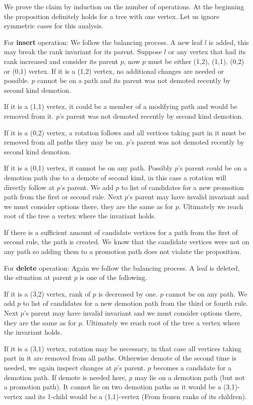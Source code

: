 \begin{myproof}
We prove the claim by induction on the number of operations. At the beginning the proposition definitely holds for a tree with one vertex. 
Let us ignore symmetric cases for this analysis.

For \textbf{insert} operation: We follow the balancing process. A new leaf $l$ is added, this may break the rank invariant for its parent. Suppose $l$ or any vertex that had its rank increased and consider its parent $p$, now $p$ must be either (1,2), (1,1), (0,2) or (0,1) vertex. 
If it is a (1,2) vertex, no additional changes are needed or possible. $p$ cannot be on a path and its parent was not demoted recently by second kind demotion.

If it is a (1,1) vertex, it could be a member of a modifying path and would be removed from it. $p$'s parent was not demoted recently by second kind demotion.

If it is a (0,2) vertex, a rotation follows and all vertices taking part in it must be removed from all paths they may be on. $p$'s parent was not demoted recently by second kind demotion.

If it is a (0,1) vertex, it cannot be on any path. Possibly $p$'s parent could be on a demotion path due to a demote of second kind, in this case a rotation will directly follow at $p$'s parent. We add $p$ to list of candidates for a new promotion path from the first or second rule. Next $p$'s parent may have invalid invariant and we must consider options there, they are the same as for $p$. Ultimately we reach root of the tree a vertex where the invariant holds.

If there is a sufficient amount of candidate vertices for a path from the first of second rule, the path is created. We know that the candidate vertices were not on any path so adding them to a promotion path does not violate the proposition.

For \textbf{delete} operation: Again we follow the balancing process. A leaf is deleted, the situation at parent $p$ is one of the following.

If it is a (3,2) vertex, rank of $p$ is decreased by one. $p$ cannot be on any path. We add $p$ to list of candidates for a new demotion path from the third or fourth rule. Next $p$'s parent may have invalid invariant and we must consider options there, they are the same as for $p$. Ultimately we reach root of the tree a vertex where the invariant holds.

If it is a (3,1) vertex, rotation may be necessary, in that case all vertices taking part in it are removed from all paths. Otherwise demote of the second time is needed, we again inspect changes at $p$'s parent. $p$ becomes a candidate for a demotion path. If demote is needed here, $p$ may lie on a demotion path (but not a promotion path). It cannot lie on two demotion paths as it would be a (3,1)-vertex and its 1-child would be a (1,1)-vertex (From frozen ranks of its children).


\end{myproof}
